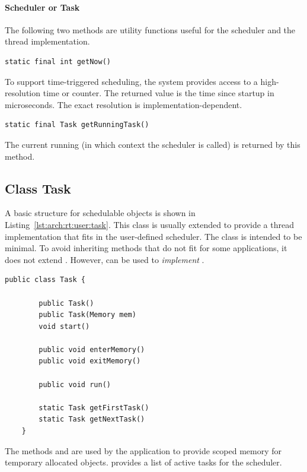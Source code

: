 \paragraph{Scheduler or Task}

The following two methods are utility functions useful for the
scheduler and the thread implementation.

\begin{lstlisting}[emph=getNow]
static final int getNow()
\end{lstlisting}
To support time-triggered scheduling, the system provides access to
a high-resolution time or counter. The returned value is the time
since startup in microseconds. The exact resolution is
implementation-dependent.

\begin{lstlisting}[emph=getRunningTask]
static final Task getRunningTask()
\end{lstlisting}
The current running  (in which context the scheduler is
called) is returned by this method.

\subsection{Class Task}

A basic structure for schedulable objects is shown in
Listing~\ref{lst:arch:rt:user:task}. This class is usually extended
to provide a thread implementation that fits in the user-defined
scheduler. The class  is intended to be minimal. To avoid
inheriting methods that do not fit for some applications, it does not
extend . However,  can be used to
\emph{implement} .

\begin{lstlisting}[float,caption=A basic schedulable object,
label=lst:arch:rt:user:task, emph={Task, start, enterMemory,
exitMemory,run,getFirstTask,getNextTask}]
    public class Task {

        public Task()
        public Task(Memory mem)
        void start()

        public void enterMemory()
        public void exitMemory()

        public void run()

        static Task getFirstTask()
        static Task getNextTask()
    }
\end{lstlisting}

The methods  and  are used by the
application to provide scoped memory for temporary allocated
objects.  provides a list of active tasks for the
scheduler.

